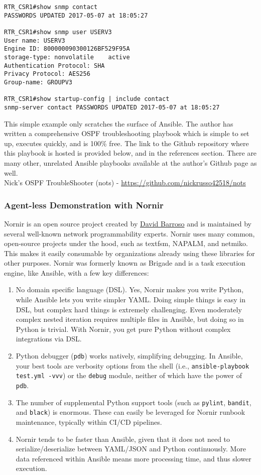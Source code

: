 \begin{verbatim}
RTR_CSR1#show snmp contact
PASSWORDS UPDATED 2017-05-07 at 18:05:27

RTR_CSR1#show snmp user USERV3
User name: USERV3
Engine ID: 800000090300126BF529F95A
storage-type: nonvolatile	 active
Authentication Protocol: SHA
Privacy Protocol: AES256
Group-name: GROUPV3

RTR_CSR1#show startup-config | include contact
snmp-server contact PASSWORDS UPDATED 2017-05-07 at 18:05:27
\end{verbatim}

This simple example only scratches the surface of Ansible. The author has
written a comprehensive OSPF troubleshooting playbook which is simple to set
up, executes quickly, and is 100\% free. The link to the Github repository
where this playbook is hosted is provided below, and in the references
section. There are many other, unrelated Ansible playbooks available at the
author's Github page as well. \\

Nick's OSPF TroubleShooter (nots) - \url{https://github.com/nickrusso42518/nots}

\subsubsection{Agent-less Demonstration with Nornir}
Nornir is an open source project created by
\href{https://twitter.com/dbarrosop/}{David Barroso} and is maintained by
several well-known network programmability experts. Nornir uses many common,
open-source projects under the hood, such as textfsm, NAPALM, and netmiko.
This makes it easily consumable by organizations already using these libraries
for other purposes.  Nornir was formerly known as Brigade and is a task
execution engine, like Ansible, with a few key differences:

\begin{enumerate}
  \item	No domain specific language (DSL). Yes, Nornir makes you write Python,
  while Ansible lets you write simpler YAML. Doing simple things is easy in
  DSL, but complex hard things is extremely challenging. Even moderately
  complex nested iteration requires multiple files in Ansible, but doing so in
  Python is trivial. With Nornir, you get pure Python without complex integrations via DSL.
  \item	Python debugger (\verb|pdb|) works natively, simplifying debugging. In
  Ansible, your best tools are verbosity options from the shell (i.e.,
  \verb|ansible-playbook test.yml -vvv|) or the \verb|debug| module, neither
  of which have the power of \verb|pdb|.
  \item	The number of supplemental Python support tools (such as
  \verb|pylint|, \verb|bandit|, and \verb|black|) is enormous. These can
  easily be leveraged for Nornir runbook maintenance, typically within CI/CD pipelines.
  \item	Nornir tends to be faster than Ansible, given that it does not need to
  serialize/deserialize between YAML/JSON and Python continuously. More data
  referenced within Ansible means more processing time, and thus slower execution.
\end{enumerate}

